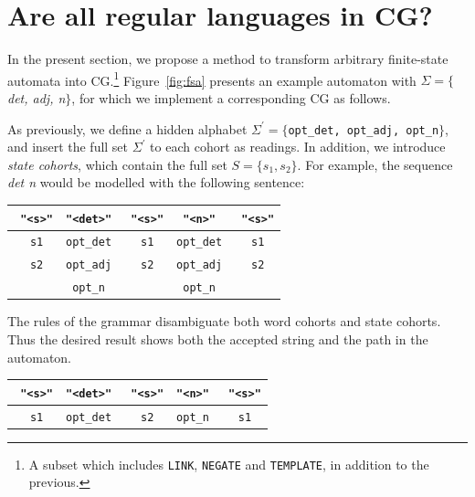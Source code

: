 \documentclass[11pt]{article}
\def\t#1{\texttt{#1}}
\def\h#1{{\tt \color{gray} #1}}
\def\swf{\h{"<s>"}}
\begin{document}
\section{Are all regular languages in CG?}


In the present section, we propose a method to transform arbitrary finite-state automata into 
CG.\footnote{A subset which includes \t{LINK}, \t{NEGATE} and \t{TEMPLATE}, in addition to the previous.}
Figure~\ref{fig:fsa} presents an example automaton with $\Sigma = \{$\emph{det, adj, n}$\}$,
for which we implement a corresponding CG as follows.

As previously, we define a hidden alphabet $\Sigma^{\prime} = \{$\t{opt\_det, opt\_adj, opt\_n}$\}$,
and insert the full set $\Sigma^{\prime}$ to each cohort as readings. 
In addition, we introduce \emph{state cohorts}, which contain the full set $S = \{s_1, s_2\}$.
For example, the sequence \emph{det n} would be modelled with the following sentence:

\begin{table}[h]
\begin{tabular}{c|c|c|c|c}
   \swf   &   \t{"<det>"}  &  \swf      &   \t{"<n>"} &  \swf     \\ \hline
 \h{s1}   & \t{opt\_det}   &  \h{ s1}   &  \t{opt\_det}  &  \h{s1}  \\
 \h{s2}   & \t{opt\_adj}   &  \h{ s2}   &  \t{opt\_adj}  &  \h{s2}  \\
          & \t{opt\_n}  &            &  \t{opt\_n} &  
\end{tabular}
\end{table}

The rules of the grammar disambiguate both word cohorts and state cohorts.
Thus the desired result shows both the accepted string and the path in the automaton.

\begin{table}[h]
\centering
\begin{tabular}{c|c|c|c|c}
   \swf   &   \t{"<det>"}  &  \swf   & \t{"<n>"}    &  \swf     \\ \hline
  \h{s1}  & \t{opt\_det} &  \h{s2}   &  \t{opt\_n}  &  \h{s1} 

\end{tabular}
\end{table}
\end{document}
